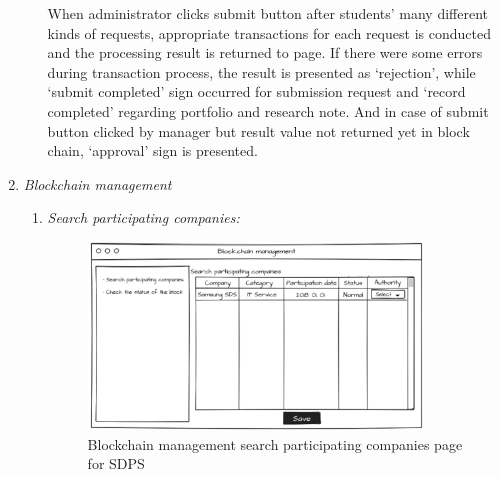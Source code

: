 \documentclass[conference]{IEEEtran}
\begin{document}
\begin{enumerate}
\begin{enumerate}
         When administrator clicks submit button after students’ many different kinds of requests, appropriate transactions for each request is conducted and the processing result is returned to page. If there were some errors during transaction process, the result is presented as ‘rejection’, while ‘submit completed’ sign occurred for submission request and ‘record completed’ regarding portfolio and research note. And in case of submit button clicked by manager but result value not returned yet in block chain, ‘approval’ sign is presented.\\
    \end{enumerate}
    
       \item \textit {Blockchain management}
    \begin{enumerate}
    	\item  \textit{Search participating companies:} 
	\begin{figure}[htbp]
	\centerline{\includegraphics[width=89mm,scale=0.5]{school/blockchain_management.png}}
	\caption{Blockchain management search participating companies page for SDPS}
	\label{fig}
	\end{figure}
	

\end{enumerate}
\end{enumerate}
\end{document}
